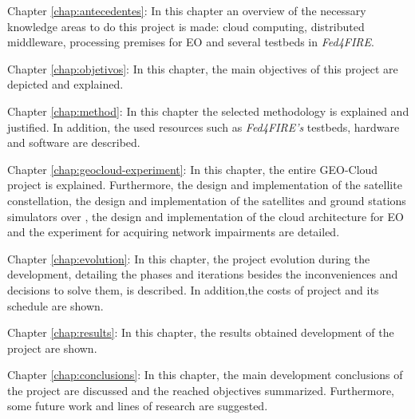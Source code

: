 \begin{definitionlist}
\item[Chapter \ref{chap:antecedentes}: \nameref{chap:antecedentes}] In this
  chapter an overview of the necessary knowledge areas to do this project is
  made: cloud computing, distributed middleware,
  processing premises for \ac{EO} and several testbeds in \emph{Fed4FIRE}.
\item[Chapter \ref{chap:objetivos}: \nameref{chap:objetivos}] In this
  chapter, the main objectives of this project are depicted and explained.
\item[Chapter \ref{chap:method}: \nameref{chap:method}] In this chapter the
  selected methodology is explained and justified. In addition, the used resources such
  as \emph{Fed4FIRE's} testbeds, hardware and software are described.
\item[Chapter \ref{chap:geocloud-experiment}: \nameref{chap:geocloud-experiment}] In this
  chapter, the entire GEO-Cloud project is explained. Furthermore, the design and implementation of the
  satellite constellation, the design and implementation of the satellites and
  ground stations simulators over \vw, the design and implementation of the
  cloud architecture for \ac{EO} and the \pl experiment for acquiring
  network impairments are detailed.
\item[Chapter \ref{chap:evolution}: \nameref{chap:evolution}] In this chapter,
  the project evolution during the development, detailing the phases and
  iterations besides the inconveniences and decisions to solve them, is
  described. In addition,the costs of project and its schedule are shown.
\item[Chapter \ref{chap:results}: \nameref{chap:results}] In this chapter, the
  results obtained development of the project are shown.
\item[Chapter \ref{chap:conclusions}: \nameref{chap:conclusions}]In this
  chapter, the main development conclusions of the project are discussed and the
  reached objectives summarized. Furthermore, some future work and lines of research are suggested.
 \end{definitionlist}
